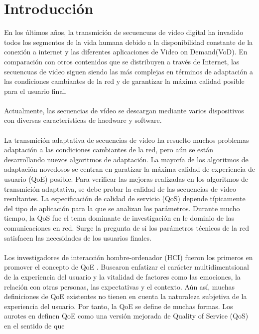 \documentclass[conference]{IEEEtran}
\begin{document}
\section{Introducción}
    En los últimos años, la transmición de secuencuas de video digital ha invadido todos 
    los segmentos de la vida humana debido a la disponibilidad constante de la conexión a 
    internet y las diferentes aplicaciones de Video on Demand(VoD). En comparación con 
    otros contenidos que se distribuyen a través de Internet, las secuencuas de video siguen 
    siendo las más complejas en términos de adaptación a las condiciones cambiantes de la 
    red y de garantizar la máxima calidad posible para el usuario final.\\
    \\
    Actualmente, las secuencias de vídeo se descargan mediante varios dispositivos 
    con diversas características de haedware y software.\\
    \\
    La transmición adaptativa de secuencias de video ha resuelto muchos problemas 
    adaptación a las condiciones cambiantes de la red, pero aún se están desarrollando 
    nuevos algoritmos de adaptación. La mayoría de los algoritmos de adaptación 
    novedosos se centran en garatizar la máxima calidad de experiencia de usuario 
    (QoE) posible. Para verificar las mejoras realizadas en los algoritmos de transmición 
    adaptativa, se debe probar la calidad de las secuencias de video resultantes. La 
    especificación de calidad de servicio (QoS) depende típicamente del tipo de 
    aplicación para la que se analizan los parámetros. Durante mucho tiempo, la QoS 
    fue el tema dominante de investigación en le dominio de las comunicaciones en red. 
    Surge la pregunta de si los parámetros técnicos de la red satisfacen las necesidades 
    de los usuarios finales.\\
    \\
    Los investigadores de interacción hombre-ordenador (HCI) fueron los primeros 
    en promover el concepto de QoE \cite{biblio1}. Buscaron enfatizar el carácter multidimentsional 
    de la experiencia del usuario y la vitalidad de factores como las emociones, la relación 
    con otras personas, las expectativas y el contexto. Aún así, muchas definiciones de 
    QoE existentes no tienen en cuenta la naturaleza subjetiva de la experiencia del 
    usuario. Por tanto, la QoE se define de muchas formas. Los aurotes en \cite{biblio2} definen 
    QoE como una versión mejorada de Quality of Service (QoS) en el sentido de que 
\end{document}
